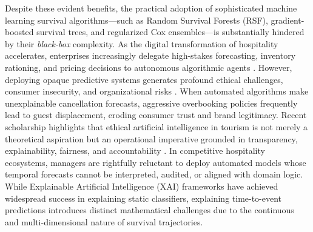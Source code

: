 \documentclass[pdflatex,iicol,sn-mathphys-ay]{sn-jnl}
\theoremstyle{thmstyleone}%
\theoremstyle{thmstyletwo}%
\theoremstyle{thmstylethree}%
\begin{document}
Despite these evident benefits, the practical adoption of sophisticated machine learning survival algorithms—such as Random Survival Forests (RSF), gradient-boosted survival trees, and regularized Cox ensembles—is substantially hindered by their \textit{black-box} complexity. As the digital transformation of hospitality accelerates, enterprises increasingly delegate high-stakes forecasting, inventory rationing, and pricing decisions to autonomous algorithmic agents \citep{dwivedi2025artificial}. However, deploying opaque predictive systems generates profound ethical challenges, consumer insecurity, and organizational risks \citep{lin2026developing}. When automated algorithms make unexplainable cancellation forecasts, aggressive overbooking policies frequently lead to guest displacement, eroding consumer trust and brand legitimacy. Recent scholarship highlights that ethical artificial intelligence in tourism is not merely a theoretical aspiration but an operational imperative grounded in transparency, explainability, fairness, and accountability \citep{law2025ethical, meske2022explainable, thiebes2021trustworthy}. In competitive hospitality ecosystems, managers are rightfully reluctant to deploy automated models whose temporal forecasts cannot be interpreted, audited, or aligned with domain logic. While Explainable Artificial Intelligence (XAI) frameworks have achieved widespread success in explaining static classifiers, explaining time-to-event predictions introduces distinct mathematical challenges due to the continuous and multi-dimensional nature of survival trajectories.
\end{document}
